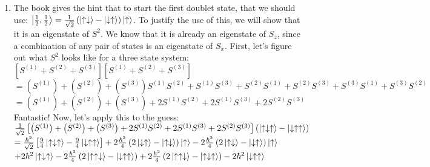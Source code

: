 \documentclass[12pt]{article}
\begin{document}
\begin{enumerate}[label=\alph*)]
\item The book gives the hint that to start the first doublet state, that we should use: $\ket{\frac{1}{2}, \frac{1}{2}} = \frac{1}{\sqrt{2}}\left(\ket{\uparrow\downarrow} - \ket{\downarrow\uparrow}\right)\ket{\uparrow}$. To justify the use of this, we will show that it is an eigenstate of $S^2$. We know that it is already an eigenstate of $S_z$, since a combination of any pair of states is an eigenstate of $S_x$. First, let's figure out what $S^2$ looks like for a three state system:\vspace{0.5em}\\
$\left[S^{(1)} + S^{(2)} + S^{(3)}\right]\left[S^{(1)} + S^{(2)} + S^{(3)}\right]$\vspace{0.5em}\\
$= \left(S^{(1)}\right) + \left(S^{(2)}\right) + \left(S^{(3)}\right) S^{(1)}S^{(2)} + S^{(1)}S^{(3)} + S^{(2)}S^{(1)} + S^{(2)}S^{(3)} + S^{(3)}S^{(1)} + S^{(3)}S^{(2)}$\vspace{0.5em}\\
$= \left(S^{(1)}\right) + \left(S^{(2)}\right) + \left(S^{(3)}\right) + 2 S^{(1)}S^{(2)} + 2S^{(1)}S^{(3)} + 2S^{(2)}S^{(3)}$\vspace{0.5em}\\
Fantastic! Now, let's apply this to the guess:\vspace{0.5em}\\
$\frac{1}{\sqrt{2}}\left[\left(S^{(1)}\right) + \left(S^{(2)}\right) + \left(S^{(3)}\right) + 2 S^{(1)}S^{(2)} + 2S^{(1)}S^{(3)} + 2S^{(2)}S^{(3)}\right]\left(\ket{\uparrow\downarrow\uparrow} - \ket{\downarrow\uparrow\uparrow}\right)$\vspace{0.5em}\\
$=\frac{\hbar^2}{\sqrt{2}}\left[\frac{9}{4}\ket{\uparrow\downarrow\uparrow} - \frac{9}{4}\ket{\downarrow\uparrow\uparrow}\right] + 2 \frac{\hbar^2}{4}\left(2\ket{\downarrow\uparrow} - \ket{\uparrow\downarrow}\right)\ket{\uparrow} - 2\frac{\hbar^2}{4}\left(2\ket{\uparrow\downarrow} - \ket{\downarrow\uparrow}\right)\ket{\uparrow} $\vspace{0.5em}\\
\hspace*{3em}$+ 2\hbar^2\ket{\uparrow\downarrow\uparrow} - 2\frac{\hbar^2}{4}\left(2\ket{\uparrow\uparrow\downarrow} - \ket{\downarrow\uparrow\uparrow}\right) + 2 \frac{\hbar^2}{4}\left(2\ket{\uparrow\uparrow\downarrow} - \ket{\uparrow\downarrow\uparrow}\right) - 2\hbar^2\ket{\downarrow\uparrow\uparrow}$\vspace{0.5em}\\

\end{enumerate}
\end{document}

